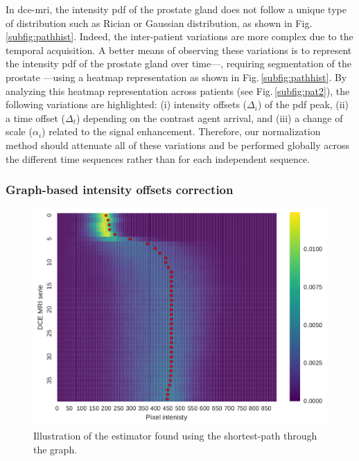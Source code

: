 In \ac{dce}-\ac{mri}, the intensity \ac{pdf} of the prostate gland does not follow a unique type of distribution such as Rician or Gaussian distribution, as shown in Fig.\,\ref{subfig:pathhist}.
Indeed, the inter-patient variations are more complex due to the temporal acquisition.
A better means of observing these variations is to represent the
intensity \ac{pdf} of the prostate gland over time---, requiring
segmentation of the prostate ---using a heatmap representation as shown in Fig.\,\ref{subfig:pathhist}.
By analyzing this heatmap representation across patients (see Fig.\,\ref{subfig:pat2}), the following variations are highlighted:
(i) intensity offsets ($\Delta_i$) of the \ac{pdf} peak,
(ii) a time offset ($\Delta_t$) depending on the contrast agent arrival, and
(iii) a change of scale ($\alpha_i$) related to the signal enhancement.
Therefore, our normalization method should attenuate all of these variations and be performed globally across the different time sequences rather than for each independent sequence.

\subsubsection{Graph-based intensity offsets correction}\label{sec:intoffsets}

\begin{figure}
  \centering
  \includegraphics[width=0.7\linewidth]{02_methods/figures/estimator.pdf}
  \caption{Illustration of the estimator found using the shortest-path through the graph.}
  \label{fig:estimator}
\end{figure}

